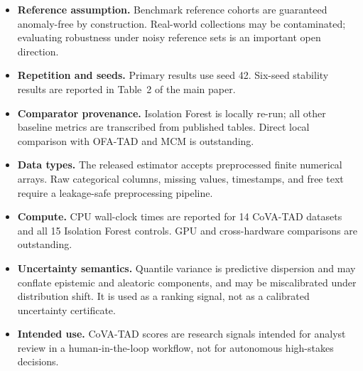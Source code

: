\documentclass{article}
\begin{document}
\begin{itemize}
  \item \textbf{Reference assumption.} Benchmark reference cohorts are guaranteed anomaly-free by construction. Real-world collections may be contaminated; evaluating robustness under noisy reference sets is an important open direction.
  \item \textbf{Repetition and seeds.} Primary results use seed 42. Six-seed stability results are reported in Table~2 of the main paper.
  \item \textbf{Comparator provenance.} Isolation Forest is locally re-run; all other baseline metrics are transcribed from published tables. Direct local comparison with OFA-TAD and MCM is outstanding.
  \item \textbf{Data types.} The released estimator accepts preprocessed finite numerical arrays. Raw categorical columns, missing values, timestamps, and free text require a leakage-safe preprocessing pipeline.
  \item \textbf{Compute.} CPU wall-clock times are reported for 14 CoVA-TAD datasets and all 15 Isolation Forest controls. GPU and cross-hardware comparisons are outstanding.
  \item \textbf{Uncertainty semantics.} Quantile variance is predictive dispersion and may conflate epistemic and aleatoric components, and may be miscalibrated under distribution shift. It is used as a ranking signal, not as a calibrated uncertainty certificate.
  \item \textbf{Intended use.} CoVA-TAD scores are research signals intended for analyst review in a human-in-the-loop workflow, not for autonomous high-stakes decisions.
\end{itemize}



\end{document}
